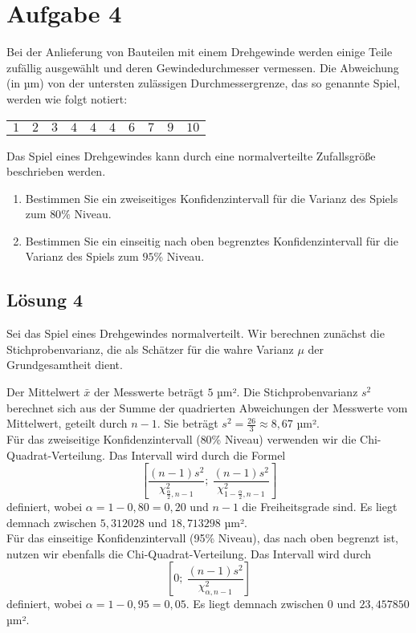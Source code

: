 \documentclass[main.tex]{subfiles}
\begin{document}
\section{Aufgabe 4}
Bei der Anlieferung von Bauteilen mit einem Drehgewinde werden einige Teile zufällig ausgewählt und deren Gewindedurchmesser vermessen. Die Abweichung (in µm) von der untersten zulässigen Durchmessergrenze, das so genannte Spiel, werden wie folgt notiert:
\begin{center}
\begin{tabular}{cccccccccc}
$1$ & $2$ & $3$ & $4$ & $4$ & $4$ & $6$ & $7$ & $9$ & $10$
\end{tabular}
\end{center}
Das Spiel eines Drehgewindes kann durch eine normalverteilte Zufallsgröße beschrieben werden.
\begin{enumerate}
\item Bestimmen Sie ein zweiseitiges Konfidenzintervall für die Varianz des Spiels zum $80\%$ Niveau.
\item Bestimmen Sie ein einseitig nach oben begrenztes Konfidenzintervall für die Varianz des Spiels zum $95$\%
Niveau.
\end{enumerate}

\subsection{Lösung 4}
Sei das Spiel eines Drehgewindes normalverteilt.
Wir berechnen zunächst die Stichprobenvarianz, die als Schätzer für die wahre Varianz $\mu$ der Grundgesamtheit dient.

Der Mittelwert $\bar{x}$ der Messwerte beträgt $5$ µm².
Die Stichprobenvarianz $s^2$ berechnet sich aus der Summe der quadrierten Abweichungen der Messwerte vom Mittelwert, geteilt durch $n-1$. Sie beträgt $s^2 = \frac{26}{3} \approx 8,67$ µm².\\

Für das zweiseitige Konfidenzintervall (80\% Niveau) verwenden wir die Chi-Quadrat-Verteilung. Das Intervall wird durch die Formel
$$
\left[
    \frac{(n-1)s^2}{\chi^2_{\frac{\alpha}{2},n-1}};\ \frac{(n-1)s^2}{\chi^2_{1-\frac{\alpha}{2},n-1}}
\right]
$$
definiert, wobei $\alpha = 1 - 0,80 = 0,20$ und $n-1$ die Freiheitsgrade sind. Es liegt demnach zwischen $5,312028$ und $18,713298$ µm².\\

Für das einseitige Konfidenzintervall (95\% Niveau), das nach oben begrenzt ist, nutzen wir ebenfalls die Chi-Quadrat-Verteilung. Das Intervall wird durch $$
    \left[0;\ \frac{(n-1)s^2}{\chi^2_{\alpha,n-1}}\right]
$$ definiert, wobei $\alpha = 1 - 0,95 = 0,05$. Es liegt demnach zwischen $0$ und $23,457850$ µm².\\
\end{document}
